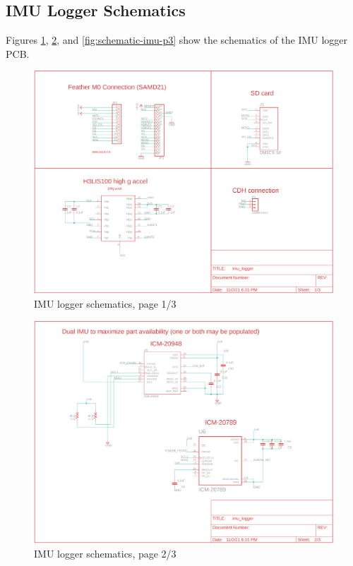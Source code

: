 \documentclass{article}
\begin{document}
\newpage
\subsection{IMU Logger Schematics}
Figures \ref{fig:schematic-imu-p1}, \ref{fig:schematic-imu-p2}, and \ref{fig:schematic-imu-p3} show the schematics of the IMU logger PCB.
\begin{figure}[H]
	\centering
	\includegraphics[width=\textwidth]{images/imu_logger_schem_1}
	\caption{IMU logger schematics, page 1/3}
	\label{fig:schematic-imu-p1}
\end{figure}
\begin{figure}[H]
	\centering
	\includegraphics[width=\textwidth]{images/imu_logger_schem_2}
	\caption{IMU logger schematics, page 2/3}
	\label{fig:schematic-imu-p2}
\end{figure}
\end{document}

